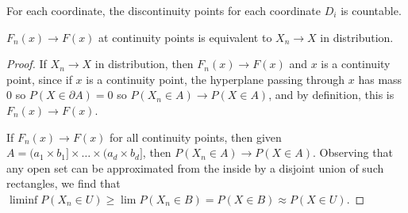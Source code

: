 \documentclass[11pt]{scrartcl}
\begin{document}
\begin{exercise} For each coordinate, the discontinuity points for each coordinate $D_i$ is countable.  
\end{exercise}

\begin{thm} $F_n(x) \to F(x)$ at continuity points is equivalent to $X_n \to X$ in distribution.
\end{thm}
\begin{proof}
If $X_n \to X$ in distribution, then $F_n(x) \to F(x)$ and $x$ is a continuity point, since if $x$ is a continuity point, the hyperplane passing through $x$ has mass $0$ so $P(X \in \partial A) = 0$ so $P(X_n \in A )\to P(X \in A)$, and by definition, this is $F_n(x) \to F(x)$.

If $F_n(x) \to F(x)$ for all continuity points, then given $A = (a_1 \times b_1] \times \dots \times (a_d \times b_d]$, then $P(X_n \in A) \to P(X \in A)$.  Observing that any open set can be approximated from the inside by a disjoint union of such rectangles, we find that $\liminf P(X_n \in U) \ge \lim P(X_n \in B) = P(X \in B) \approx P(X \in U)$.
\end{proof}
\end{document}
